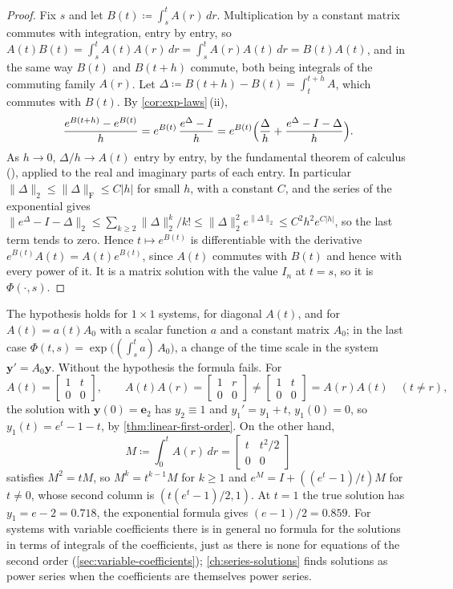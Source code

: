 \begin{proof}
Fix $s$ and let $B(t)\coloneqq\int_s^tA(r)\,dr$. Multiplication by a constant matrix commutes with integration, entry by entry, so $A(t)B(t)=\int_s^tA(t)A(r)\,dr=\int_s^tA(r)A(t)\,dr=B(t)A(t)$, and in the same way $B(t)$ and $B(t+h)$ commute, both being integrals of the commuting family $A(r)$. Let $\Delta\coloneqq B(t+h)-B(t)=\int_t^{t+h}A$, which commutes with $B(t)$. By \cref{cor:exp-laws}\,(ii),
\[
\frac{e^{B(t+h)}-e^{B(t)}}h=e^{B(t)}\,\frac{e^\Delta-I}h=e^{B(t)}\Bigl(\frac\Delta h+\frac{e^\Delta-I-\Delta}h\Bigr).
\]
As $h\to0$, $\Delta/h\to A(t)$ entry by entry, by the fundamental theorem of calculus (), applied to the real and imaginary parts of each entry. In particular $\|\Delta\|_2\le\|\Delta\|_{\mathrm F}\le C|h|$ for small $h$, with a constant $C$, and the series of the exponential gives $\|e^\Delta-I-\Delta\|_2\le\sum_{k\ge2}\|\Delta\|_2^k/k!\le\|\Delta\|_2^2e^{\|\Delta\|_2}\le C^2h^2e^{C|h|}$, so the last term tends to zero. Hence $t\mapsto e^{B(t)}$ is differentiable with the derivative $e^{B(t)}A(t)=A(t)e^{B(t)}$, since $A(t)$ commutes with $B(t)$ and hence with every power of it. It is a matrix solution with the value $I_n$ at $t=s$, so it is $\Phi(\cdot,s)$.
\end{proof}

The hypothesis holds for $1\times1$ systems, for diagonal $A(t)$, and for $A(t)=a(t)A_0$ with a scalar function $a$ and a constant matrix $A_0$; in the last case $\Phi(t,s)=\exp\bigl((\int_s^ta)\,A_0\bigr)$, a change of the time scale in the system $\mathbf y'=A_0\mathbf y$. Without the hypothesis the formula fails. For
\[
A(t)=\begin{bmatrix}1&t\\0&0\end{bmatrix},\qquad A(t)A(r)=\begin{bmatrix}1&r\\0&0\end{bmatrix}\ne\begin{bmatrix}1&t\\0&0\end{bmatrix}=A(r)A(t)\quad(t\ne r),
\]
the solution with $\mathbf y(0)=\mathbf e_2$ has $y_2\equiv1$ and $y_1'=y_1+t$, $y_1(0)=0$, so $y_1(t)=e^t-1-t$, by \cref{thm:linear-first-order}. On the other hand,
\[
M\coloneqq\int_0^tA(r)\,dr=\begin{bmatrix}t&t^2/2\\0&0\end{bmatrix}
\]
satisfies $M^2=tM$, so $M^k=t^{k-1}M$ for $k\ge1$ and $e^M=I+((e^t-1)/t)M$ for $t\ne0$, whose second column is $(t(e^t-1)/2,1)$. At $t=1$ the true solution has $y_1=e-2=0.718$, the exponential formula gives $(e-1)/2=0.859$. For systems with variable coefficients there is in general no formula for the solutions in terms of integrals of the coefficients, just as there is none for equations of the second order (\cref{sec:variable-coefficients}); \cref{ch:series-solutions} finds solutions as power series when the coefficients are themselves power series.

